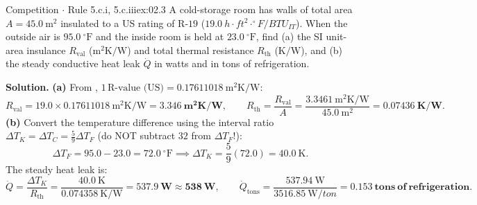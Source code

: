 \begin{workedexample}{Competition $\cdot$ Rule 5.c.i, 5.c.iii}{ex:02.3}
A cold-storage room has walls of total area $A = \SI{45.0}{\square\meter}$ insulated to a US rating of $\text{R-}19$ ($\SI{19.0}{h\cdot ft^2\cdot^\circ F/BTU_{IT}}$). When the outside air is $\SI{95.0}{^\circ\text{F}}$ and the inside room is held at $\SI{23.0}{^\circ\text{F}}$, find (a) the SI unit-area insulance $R_{\mathrm{val}}$ ($\si{\square\meter\kelvin\per\watt}$) and total thermal resistance $R_{\mathrm{th}}$ ($\si{\kelvin\per\watt}$), and (b) the steady conductive heat leak $\dot{Q}$ in watts and in tons of refrigeration.

\textbf{Solution.}
\textbf{(a)} From , $1\,\text{R-value (US)} = \SI{0.17611018}{\square\meter\kelvin\per\watt}$:
\[
  R_{\mathrm{val}} = 19.0 \times \SI{0.17611018}{\square\meter\kelvin\per\watt} = \mathbf{\SI{3.346}{\square\meter\kelvin\per\watt}}, \qquad
  R_{\mathrm{th}} = \frac{R_{\mathrm{val}}}{A} = \frac{\SI{3.3461}{\square\meter\kelvin\per\watt}}{\SI{45.0}{\square\meter}} = \mathbf{\SI{0.07436}{\kelvin\per\watt}}.
\]
\textbf{(b)} Convert the temperature difference using the interval ratio $\Delta T_K = \Delta T_C = \frac{5}{9}\Delta T_F$ (do NOT subtract $32$ from $\Delta T_F$!):
\[
  \Delta T_F = 95.0 - 23.0 = \SI{72.0}{^\circ\text{F}} \implies \Delta T_K = \frac{5}{9}(72.0) = \SI{40.0}{\kelvin}.
\]
The steady heat leak is:
\[
  \dot{Q} = \frac{\Delta T_K}{R_{\mathrm{th}}} = \frac{\SI{40.0}{\kelvin}}{\SI{0.074358}{\kelvin\per\watt}} = \mathbf{\SI{537.9}{\watt} \approx \SI{538}{\watt}}, \qquad
  \dot{Q}_{\mathrm{tons}} = \frac{\SI{537.94}{\watt}}{\SI{3516.85}{\watt/ton}} = \mathbf{\SI{0.153}{tons\ of\ refrigeration}}.
\]
\end{workedexample}

